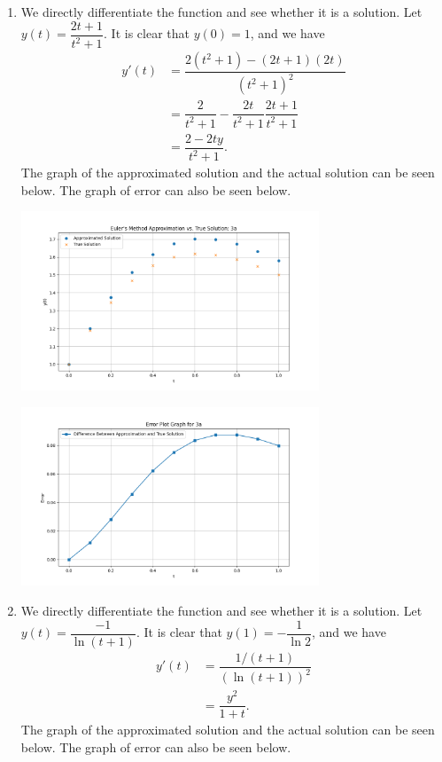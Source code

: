 \documentclass[11pt]{article}
\theoremstyle{break}
\numberwithin{equation}{theorem}
\begin{document}
\begin{enumerate}
    \item We directly differentiate the function and see whether it is a solution. Let $y(t) = \dfrac{2t+1}{t^2+1}$. It is clear that $y(0) = 1$, and we have \begin{align*}
        y'(t) &= \dfrac{2(t^2+1) - (2t+1)(2t)}{(t^2+1)^2}\\
        &= \dfrac{2}{t^2+1} - \dfrac{2t}{t^2+1}\dfrac{2t+1}{t^2+1}\\
        &= \dfrac{2 - 2ty}{t^2+1}.
    \end{align*} The graph of the approximated solution and the actual solution can be seen below. The graph of error can also be seen below.
    \begin{center}
        \includegraphics[width=0.7\textwidth]{P3a.png}
    \end{center}
    \begin{center}
        \includegraphics[width=0.7\textwidth]{P3ae.png}
    \end{center}
    \item We directly differentiate the function and see whether it is a solution. Let $y(t) = \dfrac{-1}{\ln(t+1)}$. It is clear that $y(1) = -\dfrac{1}{\ln 2}$, and we have \begin{align*}
        y'(t) &= \dfrac{1/(t+1)}{(\ln(t+1))^2}\\
        &= \dfrac{y^2}{1+t}.
    \end{align*} The graph of the approximated solution and the actual solution can be seen below. The graph of error can also be seen below.

\end{enumerate}
\end{document}
